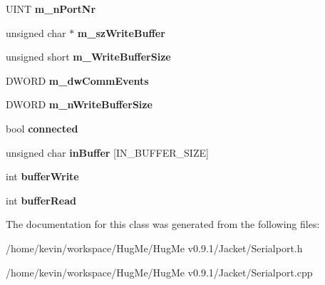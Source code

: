 \begin{DoxyCompactItemize}
\item 
\hypertarget{classCSerialPort_a16c93a6c87ae31ff80eb2ef5c655f45a}{
UINT {\bfseries m\_\-nPortNr}}
\label{classCSerialPort_a16c93a6c87ae31ff80eb2ef5c655f45a}

\item 
\hypertarget{classCSerialPort_ac7ba598ab505a6bb7bf011d4c046ef0e}{
unsigned char $\ast$ {\bfseries m\_\-szWriteBuffer}}
\label{classCSerialPort_ac7ba598ab505a6bb7bf011d4c046ef0e}

\item 
\hypertarget{classCSerialPort_af758a1a7ebc24c8a4223accce75a9673}{
unsigned short {\bfseries m\_\-WriteBufferSize}}
\label{classCSerialPort_af758a1a7ebc24c8a4223accce75a9673}

\item 
\hypertarget{classCSerialPort_af6b5fa783fef229806f8662b0df2c18e}{
DWORD {\bfseries m\_\-dwCommEvents}}
\label{classCSerialPort_af6b5fa783fef229806f8662b0df2c18e}

\item 
\hypertarget{classCSerialPort_a0da3f981892077c2193aff091379eac6}{
DWORD {\bfseries m\_\-nWriteBufferSize}}
\label{classCSerialPort_a0da3f981892077c2193aff091379eac6}

\item 
\hypertarget{classCSerialPort_aec4a44728b9218106547c975b62f51fa}{
bool {\bfseries connected}}
\label{classCSerialPort_aec4a44728b9218106547c975b62f51fa}

\item 
\hypertarget{classCSerialPort_a88885412d6681041e2371d4e222b5cea}{
unsigned char {\bfseries inBuffer} \mbox{[}IN\_\-BUFFER\_\-SIZE\mbox{]}}
\label{classCSerialPort_a88885412d6681041e2371d4e222b5cea}

\item 
\hypertarget{classCSerialPort_ae1ef9cb92cdf3a47520457a0164a59f8}{
int {\bfseries bufferWrite}}
\label{classCSerialPort_ae1ef9cb92cdf3a47520457a0164a59f8}

\item 
\hypertarget{classCSerialPort_a2373805b68f988f7989074f329855117}{
int {\bfseries bufferRead}}
\label{classCSerialPort_a2373805b68f988f7989074f329855117}

\end{DoxyCompactItemize}


The documentation for this class was generated from the following files:\begin{DoxyCompactItemize}
\item 
/home/kevin/workspace/HugMe/HugMe v0.9.1/Jacket/Serialport.h\item 
/home/kevin/workspace/HugMe/HugMe v0.9.1/Jacket/Serialport.cpp\end{DoxyCompactItemize}

